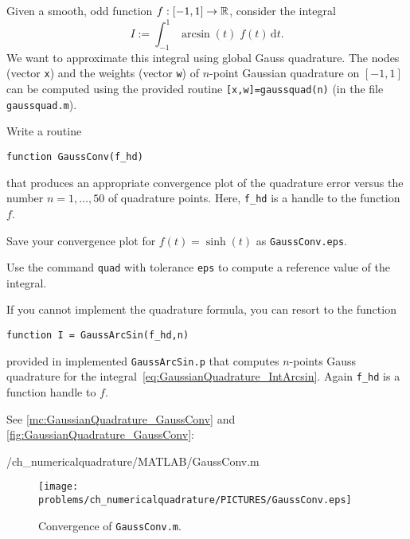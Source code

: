 
\begin{problem} \label{prb:GaussianQuadrature}

Given a smooth, odd function $f:[-1,1]\rightarrow\mathbb{R}$, consider the integral
\begin{equation}
\label{eq:GaussianQuadrature_IntArcsin}
I := \int_{-1}^{1} \arcsin(t) \; f(t) \,\mathrm{d}t.
\end{equation}
We want to approximate this integral using global Gauss quadrature.
The nodes (vector \texttt{x}) and the weights (vector \texttt{w}) of $n$-point Gaussian quadrature on $[-1,1]$ can be computed using the provided \Matlab{} routine \texttt{[x,w]=gaussquad(n)} (in the file \texttt{gaussquad.m}).


\begin{subproblem}[3] \label{subprb:GaussianQuadrature_1}
Write a \Matlab{} routine
\begin{center}
\texttt{function \quad GaussConv(f\_hd)}
\end{center}
that produces an appropriate convergence plot of the quadrature error versus the
number $n=1,\ldots,50$ of quadrature points. Here, \texttt{f\_hd} is a handle to
the function $f$.

Save your convergence plot for $f(t)=\sinh(t)$ as \texttt{GaussConv.eps}.
\begin{hint}
Use the \Matlab{} command \texttt{quad} with tolerance \texttt{eps} to compute a reference value of the integral.
\end{hint}

\begin{hint}
If you cannot implement the quadrature formula, you can resort to the \Matlab{} function
\begin{center}
\texttt{function \quad I = GaussArcSin(f\_hd,n)}
\end{center}
provided in implemented \texttt{GaussArcSin.p} that computes $n$-points Gauss
quadrature for the integral~\eqref{eq:GaussianQuadrature_IntArcsin}. Again \texttt{f\_hd} is a
function handle to $f$.
\end{hint}

\cprotEnv \begin{solution}
See \autoref{mc:GaussianQuadrature_GaussConv} and \autoref{fig:GaussianQuadrature_GaussConv}:

{\problems/ch_numericalquadrature/MATLAB/GaussConv.m}
\begin{figure}
\centering
\texttt{[image: \\problems/ch\_numericalquadrature/PICTURES/GaussConv.eps]}
\caption{Convergence of \texttt{GaussConv.m}.}
\label{fig:GaussianQuadrature_GaussConv}
\end{figure}
\end{solution}
\end{subproblem}


\end{problem}
